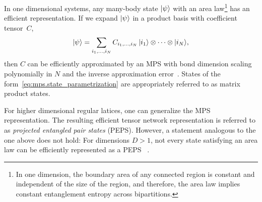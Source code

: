 In one dimensional systems, any many-body state $\ket{\psi}$ with an area law\footnote{%
  In one dimension, the boundary area of any connected region is constant and independent of the size of the region, and therefore, the area law implies constant entanglement entropy across bipartitions.
}
has an efficient representation.
If we expand $\ket{\psi}$ in a product basis with coefficient tensor~$C$,
\[
  \ket\psi = \sum_{i_1,\ldots,i_N} C_{i_1,\ldots,i_N} \, \ket{i_1} \otimes \cdots \otimes \ket{i_N},
  \label{eq:mps.state_parametrization}
\]
then $C$ can be efficiently approximated by an MPS with bond dimension scaling polynomially in $N$ and the inverse approximation error~\cite{Hastings_2006_Solving,Verstraete_2006_Matrix,Eisert_2010_Colloquium,Arad_2013_Area,Arad_2016_Rigorous}.
States of the form~\eqref{eq:mps.state_parametrization} are appropriately referred to as matrix product states.

For higher dimensional regular latices, one can generalize the MPS representation.
The resulting efficient tensor network representation is referred to as \emph{projected entangled pair states} (PEPS).
However, a statement analogous to the one above does not hold:
For dimensions $D > 1$, not every state satisfying an area law can be efficiently represented as a PEPS~\cite{Ge_2016_Area}
.\\


